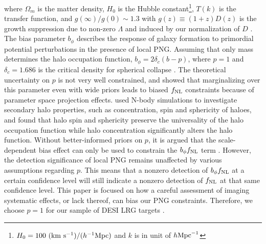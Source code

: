 where $\Omega_{m}$ is the matter density, $H_{0}$ is the Hubble constant\footnote{$H_{0}=100~({\rm km}~{\rm s}^{-1})/(h^{-1}{\rm Mpc})$ and $k$ is in unit of $h {\rm Mpc}^{-1}$}, $T(k)$ is the transfer function, and $g(\infty)/g(0) \sim 1.3$ with $g(z)\equiv (1+z) D(z)$ is the growth suppression due to non-zero $\Lambda$ and induced by our normalization of $D$ \citep[see, e.g.,][]{2010JCAP...07..013R, 2019MNRAS.485.4160M}. The bias parameter $b_{\phi}$ describes the response of galaxy formation to primordial potential perturbations in the presence of local PNG. Assuming that only mass determines the halo occupation function, $b_{\phi} = 2 \delta_{c}(b - p)$, where $p=1$ and $\delta_{c}= 1.686$ is the critical density for spherical collapse \citep{fillmore1984self}. The theoretical uncertainty on $p$ is not very well constrained, and \cite{2022JCAP...11..013B} showed that marginalizing over this parameter even with wide priors leads to biased $f_{\rm NL}$ constraints because of parameter space projection effects. \cite{2023JCAP...01..023L} used N-body simulations to investigate secondary halo properties, such as concentration, spin and sphericity of haloes, and found that halo spin and sphericity preserve the universality of the halo occupation function while halo concentration significantly alters the halo function. Without better-informed priors on $p$, it is argued that the scale-dependent bias effect can only  be used to constrain the $b_{\phi}f_{\rm NL}$ term \citep[see, e.g.,][]{2020JCAP...12..013B, 2020JCAP...12..031B}. However, the detection significance of local PNG remains unaffected by various assumptions regarding $p$. This means that a nonzero detection of $b_{\phi}f_{\rm NL}$ at a certain confidence level will still indicate a nonzero detection of $f_{\rm NL}$ at that same confidence level. This paper is focused on how a careful assessment of imaging systematic effects, or lack thereof, can bias our PNG constraints. Therefore, we choose $p=1$ for our sample of DESI LRG targets \citep[see, also,][]{slosar2008constraints,2010JCAP...07..013R,2013MNRAS.428.1116R}.


